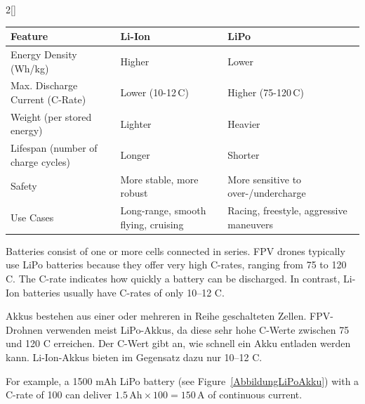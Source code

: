 \begin{paracol}{2}[]
\begin{table}[htb!]
\centering
{}
\label{TabelleLiPoLiIonAkkus}
\setlength{\tabcolsep}{3pt} %
\renewcommand{\arraystretch}{1.0} %
\scriptsize
\begin{tabularx}{\textwidth}{lXX}
\toprule
Feature                         & Li-Ion & LiPo    \\
\midrule
Energy Density (Wh/kg)          & Higher                             & Lower  \\
Max. Discharge Current (C-Rate) & Lower (10-12\,C)                   & Higher (75-120\,C) \\
Weight (per stored energy)      & Lighter                            & Heavier \\   
Lifespan (number of charge cycles) & Longer                          & Shorter \\      
Safety                         & More stable, more robust            & More sensitive to over-/undercharge \\
Use Cases                      & Long-range, smooth flying, cruising & Racing, freestyle, aggressive maneuvers  \\
\bottomrule
\end{tabularx}
\end{table}
\FloatBarrier

\renewcommand{\deutschertitel}{Lade- oder Entladerate (C-Wert)}
\renewcommand{\englischertitel}{Charge and Discharge Rate (C-Rate)}
\makrounterabschnitt
\label{AbschnittCWertAkkus}

Batteries consist of one or more cells connected in series. FPV drones typically use LiPo batteries because they offer very high C-rates, ranging from 75 to 120 C. The C-rate indicates how quickly a battery can be discharged. In contrast, Li-Ion batteries usually have C-rates of only 10--12 C.

\colger

Akkus bestehen aus einer oder mehreren in Reihe geschalteten Zellen. FPV-Drohnen verwenden meist LiPo-Akkus, da diese sehr hohe C-Werte zwischen 75 und 120 C erreichen. Der C-Wert gibt an, wie schnell ein Akku entladen werden kann. Li-Ion-Akkus bieten im Gegensatz dazu nur 10--12 C.

\coleng

For example, a 1500 mAh LiPo battery (see Figure~\ref{AbbildungLiPoAkku}) with a C-rate of 100 can deliver \(1.5\,\mbox{Ah} \times 100 = 150\,\mbox{A}\) of continuous current.


\end{paracol}
